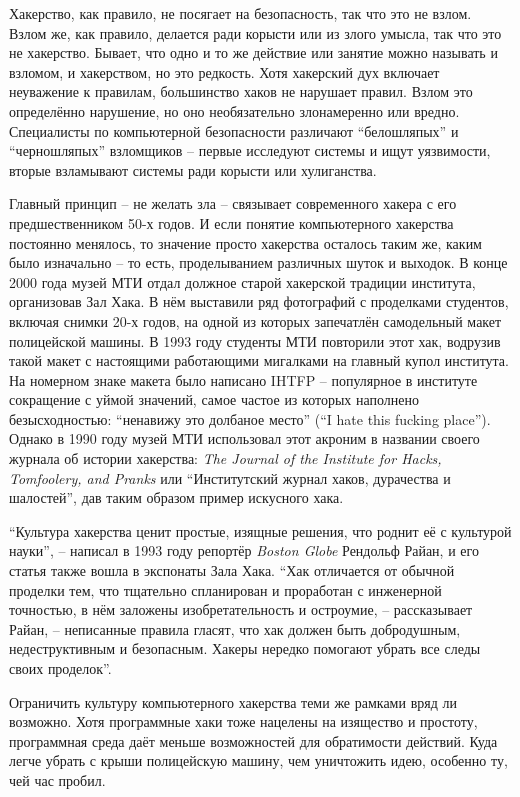 Хакерство, как правило, не посягает на безопасность, так что это не взлом. Взлом же, как правило, делается ради корысти или из злого умысла, так что это не хакерство. Бывает, что одно и то же действие или занятие можно называть и взломом, и хакерством, но это редкость. Хотя хакерский дух включает неуважение к правилам, большинство хаков не нарушает правил. Взлом это определённо нарушение, но оно необязательно злонамеренно или вредно. Специалисты по компьютерной безопасности различают \enquote{белошляпых} и \enquote{черношляпых} взломщиков -- первые исследуют системы и ищут уязвимости, вторые взламывают системы ради корысти или хулиганства.

Главный принцип -- не желать зла -- связывает современного хакера с его предшественником 50-х годов. И если понятие компьютерного хакерства постоянно менялось, то значение просто хакерства осталось таким же, каким было изначально -- то есть, проделыванием различных шуток и выходок. В конце 2000 года музей МТИ отдал должное старой хакерской традиции института, организовав Зал Хака. В нём выставили ряд фотографий с проделками студентов, включая снимки 20-х годов, на одной из которых запечатлён самодельный макет полицейской машины. В 1993 году студенты МТИ повторили этот хак, водрузив такой макет с настоящими работающими мигалками на главный купол института. На номерном знаке макета было написано IHTFP -- популярное в институте сокращение с уймой значений, самое частое из которых наполнено безысходностью: \enquote{ненавижу это долбаное место} (\enquote{I hate this fucking place}). Однако в 1990 году музей МТИ использовал этот акроним в названии своего журнала об истории хакерства: \textit{The Journal of the Institute for Hacks, Tomfoolery, and Pranks} или \enquote{Институтский журнал хаков, дурачества и шалостей}, дав таким образом пример искусного хака.

\enquote{Культура хакерства ценит простые, изящные решения, что роднит её с культурой науки}, -- написал в 1993 году репортёр \textit{Boston Globe} Рендольф Райан, и его статья также вошла в экспонаты Зала Хака. \enquote{Хак отличается от обычной проделки тем, что тщательно спланирован и проработан с инженерной точностью, в нём заложены изобретательность и остроумие, -- рассказывает Райан, -- неписанные правила гласят, что хак должен быть добродушным, недеструктивным и безопасным. Хакеры нередко помогают убрать все следы своих проделок}.

Ограничить культуру компьютерного хакерства теми же рамками вряд ли возможно. Хотя программные хаки тоже нацелены на изящество и простоту, программная среда даёт меньше возможностей для обратимости действий. Куда легче убрать с крыши полицейскую машину, чем уничтожить идею, особенно ту, чей час пробил.

